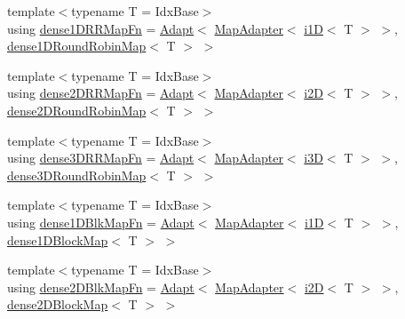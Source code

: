\begin{DoxyCompactItemize}
\item 
{\footnotesize template$<$typename T  = Idx\+Base$>$ }\\using \hyperlink{namespacevt_1_1mapping_a2512459116047e3e14365e1a8f41efd7}{dense1\+D\+R\+R\+Map\+Fn} = \hyperlink{namespacevt_1_1mapping_ab3efa0ad45a85d80210d4acef3bb6c22}{Adapt}$<$ \hyperlink{namespacevt_1_1mapping_a41b113c28bb6430fbcb5be66e08ccf9f}{Map\+Adapter}$<$ \hyperlink{namespacevt_1_1mapping_af0c14a9a77e0311b3d089143ed93ba76}{i1D}$<$ T $>$ $>$, \hyperlink{namespacevt_1_1mapping_a2a4e62c5dc17da0032d3953c7e3cde8b}{dense1\+D\+Round\+Robin\+Map}$<$ T $>$ $>$
\item 
{\footnotesize template$<$typename T  = Idx\+Base$>$ }\\using \hyperlink{namespacevt_1_1mapping_a6038870f6fcb87803b82114c71e6aa9b}{dense2\+D\+R\+R\+Map\+Fn} = \hyperlink{namespacevt_1_1mapping_ab3efa0ad45a85d80210d4acef3bb6c22}{Adapt}$<$ \hyperlink{namespacevt_1_1mapping_a41b113c28bb6430fbcb5be66e08ccf9f}{Map\+Adapter}$<$ \hyperlink{namespacevt_1_1mapping_a6448c875e0807b43f31e96fc5b0cec04}{i2D}$<$ T $>$ $>$, \hyperlink{namespacevt_1_1mapping_ac606a5886c93a4dbb05dfead285c30c6}{dense2\+D\+Round\+Robin\+Map}$<$ T $>$ $>$
\item 
{\footnotesize template$<$typename T  = Idx\+Base$>$ }\\using \hyperlink{namespacevt_1_1mapping_acdcf6cb63043d58e9c50144bdc8b59dd}{dense3\+D\+R\+R\+Map\+Fn} = \hyperlink{namespacevt_1_1mapping_ab3efa0ad45a85d80210d4acef3bb6c22}{Adapt}$<$ \hyperlink{namespacevt_1_1mapping_a41b113c28bb6430fbcb5be66e08ccf9f}{Map\+Adapter}$<$ \hyperlink{namespacevt_1_1mapping_af435b967b9ed1ccb5ec4effdbd9abd13}{i3D}$<$ T $>$ $>$, \hyperlink{namespacevt_1_1mapping_aa48fa3b830b637787c584dbac5bba6db}{dense3\+D\+Round\+Robin\+Map}$<$ T $>$ $>$
\item 
{\footnotesize template$<$typename T  = Idx\+Base$>$ }\\using \hyperlink{namespacevt_1_1mapping_a433597bc51c453de93aeb1312676c70c}{dense1\+D\+Blk\+Map\+Fn} = \hyperlink{namespacevt_1_1mapping_ab3efa0ad45a85d80210d4acef3bb6c22}{Adapt}$<$ \hyperlink{namespacevt_1_1mapping_a41b113c28bb6430fbcb5be66e08ccf9f}{Map\+Adapter}$<$ \hyperlink{namespacevt_1_1mapping_af0c14a9a77e0311b3d089143ed93ba76}{i1D}$<$ T $>$ $>$, \hyperlink{namespacevt_1_1mapping_a2d49151f03d4ce393b01c620f6b18517}{dense1\+D\+Block\+Map}$<$ T $>$ $>$
\item 
{\footnotesize template$<$typename T  = Idx\+Base$>$ }\\using \hyperlink{namespacevt_1_1mapping_adfd6b43dd7e4a4dbb66ee9065ca4bc3a}{dense2\+D\+Blk\+Map\+Fn} = \hyperlink{namespacevt_1_1mapping_ab3efa0ad45a85d80210d4acef3bb6c22}{Adapt}$<$ \hyperlink{namespacevt_1_1mapping_a41b113c28bb6430fbcb5be66e08ccf9f}{Map\+Adapter}$<$ \hyperlink{namespacevt_1_1mapping_a6448c875e0807b43f31e96fc5b0cec04}{i2D}$<$ T $>$ $>$, \hyperlink{namespacevt_1_1mapping_aca20bcd20c24f4a43e217ca63bf5812c}{dense2\+D\+Block\+Map}$<$ T $>$ $>$

\end{DoxyCompactItemize}
